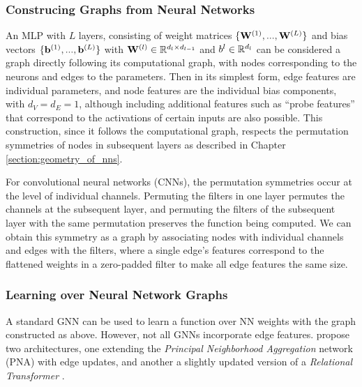 \subsubsection{Construcing Graphs from Neural Networks}

An MLP with $L$ layers, consisting of weight matrices $\{ \mathbf{W}^{(1)},...,\mathbf{W}^{(L)} \}$ and bias vectors $\{ \mathbf{b}^{(1)},...,\mathbf{b}^{(L)}\}$ with $\mathbf{W}^{(l)} \in \mathbb{R}^{d_l \times d_{l-1}}$ and $b^{l}\in \mathbb{R}^{d_l}$ can be considered a graph directly following its computational graph, with nodes corresponding to the neurons and edges to the parameters. Then in its simplest form, edge features are individual parameters, and node features are the individual bias components, with $d_V = d_E = 1$, although including additional features such as ``probe features'' that correspond to the activations of certain inputs are also possible. This construction, since it follows the computational graph, respects the permutation symmetries of nodes in subsequent layers as described in Chapter \ref{section:geometry_of_nns}.

For convolutional neural networks (CNNs), the permutation symmetries occur at the level of individual channels. Permuting the filters in one layer permutes the channels at the subsequent layer, and permuting the filters of the subsequent layer with the same permutation preserves the function being computed. We can obtain this symmetry as a graph by associating nodes with individual channels and edges with the filters, where a single edge's features correspond to the flattened weights in a zero-padded filter to make all edge features the same size. 

\subsubsection{Learning over Neural Network Graphs} \label{sec:learning_graphs}

A standard GNN can be used to learn a function over NN weights with the graph constructed as above. However, not all GNNs incorporate edge features. \citet{kofinasGraphNeuralNetworks2024} propose two architectures, one extending the \textit{Principal Neighborhood Aggregation} network (PNA) \citep{corsoPrincipalNeighbourhoodAggregation2020} with edge updates, and another a slightly updated version of a \textit{Relational Transformer} \citep{diaoRelationalAttentionGeneralizing2023}. 

